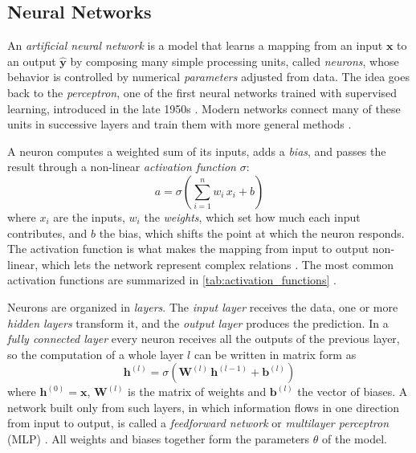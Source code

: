 \subsection{Neural Networks}
\label{subsec:neural_networks}

An \emph{artificial neural network} is a model that learns a mapping from an input $\mathbf{x}$ to an output $\hat{\mathbf{y}}$ by composing many simple processing units, called \emph{neurons}, whose behavior is controlled by numerical \emph{parameters} adjusted from data. The idea goes back to the \emph{perceptron}, one of the first neural networks trained with supervised learning, introduced in the late 1950s \parencite{schmidhuber2015deep}. Modern networks connect many of these units in successive layers and train them with more general methods \parencite{alzubaidi2021review}.

A neuron computes a weighted sum of its inputs, adds a \emph{bias}, and passes the result through a non-linear \emph{activation function} $\sigma$:
\begin{equation}
  a = \sigma\!\left( \sum_{i=1}^{n} w_i\, x_i + b \right)
  \label{eq:neuron}
\end{equation}
where $x_i$ are the inputs, $w_i$ the \emph{weights}, which set how much each input contributes, and $b$ the bias, which shifts the point at which the neuron responds. The activation function is what makes the mapping from input to output non-linear, which lets the network represent complex relations \parencite{alzubaidi2021review}. The most common activation functions are summarized in \cref{tab:activation_functions} \parencite{yamashita2018convolutional,alzubaidi2021review}.



Neurons are organized in \emph{layers}. The \emph{input layer} receives the data, one or more \emph{hidden layers} transform it, and the \emph{output layer} produces the prediction. In a \emph{fully connected layer} every neuron receives all the outputs of the previous layer, so the computation of a whole layer $l$ can be written in matrix form as
\begin{equation}
  \mathbf{h}^{(l)} = \sigma\!\left( \mathbf{W}^{(l)}\, \mathbf{h}^{(l-1)} + \mathbf{b}^{(l)} \right)
  \label{eq:layer}
\end{equation}
where $\mathbf{h}^{(0)} = \mathbf{x}$, $\mathbf{W}^{(l)}$ is the matrix of weights and $\mathbf{b}^{(l)}$ the vector of biases. A network built only from such layers, in which information flows in one direction from input to output, is called a \emph{feedforward network} or \emph{multilayer perceptron} (MLP) \parencite{alzubaidi2021review}. All weights and biases together form the parameters $\theta$ of the model.

